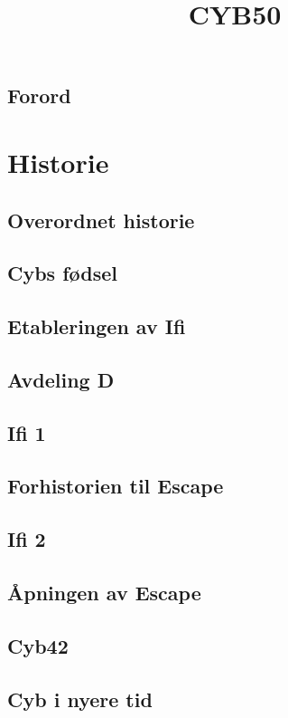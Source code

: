 \documentclass[12pt, a4paper]{book}
\title{CYB50}
\date{}
\begin{document}
\maketitle

\newpage

\tableofcontents

\newpage


\chapter*{Forord}

\newpage

\part{Historie}
\chapter{Overordnet historie}
\chapter{Cybs fødsel}
\chapter{Etableringen av Ifi}
\chapter{Avdeling D}
\chapter{Ifi 1}
\chapter{Forhistorien til Escape}
\chapter{Ifi 2}
\chapter{Åpningen av Escape}
\chapter{Cyb42}
\chapter{Cyb i nyere tid}
\end{document}
